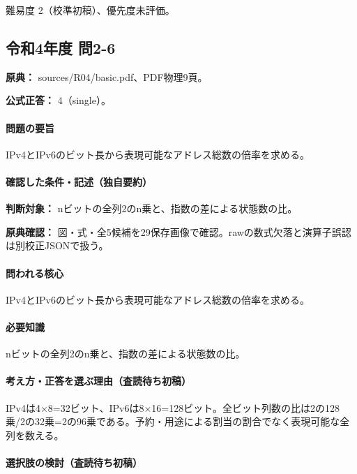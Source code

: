 \par 難易度 2（校準初稿）、優先度未評価。

\subsection{令和4年度 問2-6}
\label{q:r04-reg-basic-2-6}

\noindent\textbf{原典：} sources/R04/basic.pdf、PDF物理9頁。

\textbf{公式正答：} 4（single）。

\paragraph{問題の要旨} IPv4とIPv6のビット長から表現可能なアドレス総数の倍率を求める。

\paragraph{確認した条件・記述（独自要約）}\mbox{}\par

\noindent\textbf{判断対象：} nビットの全列2のn乗と、指数の差による状態数の比。\par

\noindent\textbf{原典確認：} 図・式・全5候補を29保存画像で確認。rawの数式欠落と演算子誤認は別校正JSONで扱う。\par

\paragraph{問われる核心} IPv4とIPv6のビット長から表現可能なアドレス総数の倍率を求める。

\paragraph{必要知識} nビットの全列2のn乗と、指数の差による状態数の比。

\paragraph{考え方・正答を選ぶ理由（査読待ち初稿）} IPv4は4×8=\allowbreak{}32ビット、IPv6は8×16=\allowbreak{}128ビット。全ビット列数の比は2の128乗/2の32乗=2の96乗である。予約・用途による割当の割合でなく表現可能な全列を数える。

\paragraph{選択肢の検討（査読待ち初稿）}\mbox{}\par

